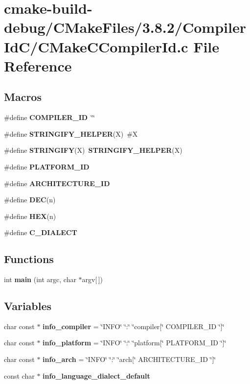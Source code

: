 \section{cmake-\/build-\/debug/\+C\+Make\+Files/3.8.2/\+Compiler\+Id\+C/\+C\+Make\+C\+Compiler\+Id.c File Reference}
\label{_c_make_c_compiler_id_8c}
\subsection*{Macros}
\begin{DoxyCompactItemize}
\item 
\#define {\bf C\+O\+M\+P\+I\+L\+E\+R\+\_\+\+ID}~\char`\"{}\char`\"{}
\item 
\#define {\bf S\+T\+R\+I\+N\+G\+I\+F\+Y\+\_\+\+H\+E\+L\+P\+ER}(X)~\#X
\item 
\#define {\bf S\+T\+R\+I\+N\+G\+I\+FY}(X)~{\bf S\+T\+R\+I\+N\+G\+I\+F\+Y\+\_\+\+H\+E\+L\+P\+ER}(X)
\item 
\#define {\bf P\+L\+A\+T\+F\+O\+R\+M\+\_\+\+ID}
\item 
\#define {\bf A\+R\+C\+H\+I\+T\+E\+C\+T\+U\+R\+E\+\_\+\+ID}
\item 
\#define {\bf D\+EC}(n)
\item 
\#define {\bf H\+EX}(n)
\item 
\#define {\bf C\+\_\+\+D\+I\+A\+L\+E\+CT}
\end{DoxyCompactItemize}
\subsection*{Functions}
\begin{DoxyCompactItemize}
\item 
int {\bf main} (int argc, char $\ast$argv[$\,$])
\end{DoxyCompactItemize}
\subsection*{Variables}
\begin{DoxyCompactItemize}
\item 
char const $\ast$ {\bf info\+\_\+compiler} = \char`\"{}I\+N\+FO\char`\"{} \char`\"{}\+:\char`\"{} \char`\"{}compiler[\char`\"{} C\+O\+M\+P\+I\+L\+E\+R\+\_\+\+ID \char`\"{}]\char`\"{}
\item 
char const $\ast$ {\bf info\+\_\+platform} = \char`\"{}I\+N\+FO\char`\"{} \char`\"{}\+:\char`\"{} \char`\"{}platform[\char`\"{} P\+L\+A\+T\+F\+O\+R\+M\+\_\+\+ID \char`\"{}]\char`\"{}
\item 
char const $\ast$ {\bf info\+\_\+arch} = \char`\"{}I\+N\+FO\char`\"{} \char`\"{}\+:\char`\"{} \char`\"{}arch[\char`\"{} A\+R\+C\+H\+I\+T\+E\+C\+T\+U\+R\+E\+\_\+\+ID \char`\"{}]\char`\"{}
\item 
const char $\ast$ {\bf info\+\_\+language\+\_\+dialect\+\_\+default}
\end{DoxyCompactItemize}


